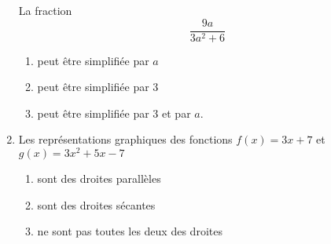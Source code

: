 \begin{exercice}[\ldots/4]
\begin{multicols}{2}
\begin{enumerate}
    La fraction
    \begin{equation*}
        \frac{ 9a }{ 3a^2+6 }
    \end{equation*}
    
    \begin{enumerate}
        \item
            peut être simplifiée par \( a\)
        \item   \label{ItemCEzoQCB}
            peut être simplifiée par \( 3\)
        \item
            peut être simplifiée par \( 3\) et par \( a\).
    \end{enumerate}

\item

    Les représentations graphiques des fonctions \( f(x)=3x+7\) et \( g(x)=3x^2+5x-7\)
    \begin{enumerate}
        \item
            sont des droites parallèles
        \item
            sont des droites sécantes
        \item\label{ItemEKKQLoz}
            ne sont pas toutes les deux des droites
    \end{enumerate}

    \end{enumerate}
    \end{multicols}

\end{exercice}
